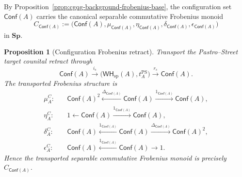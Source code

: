 \documentclass[oneside]{article}
\newcommand{\Conf}{\mathsf{Conf}}
\newcommand{\WH}{\mathsf{WH}}
\newcommand{\Sp}{\mathbf{Sp}}
\theoremstyle{plain}
\newtheorem{proposition}[theorem]{Proposition}
\theoremstyle{definition}
\theoremstyle{remark}
\begin{document}
By Proposition~\ref{prop:cgqg-background-frobenius-base}, the configuration set \(\Conf(A)\) carries the canonical separable commutative Frobenius monoid
\[
    C_{\Conf(A)}
    :=
    \bigl(
        \Conf(A),
        \mu_{\Conf(A)},
        \eta_{\Conf(A)},
        \delta_{\Conf(A)},
        \epsilon_{\Conf(A)}
    \bigr)
\]
in \(\Sp\).

\begin{proposition}[Configuration Frobenius retract]
\label{prop:cgqg-configuration-frobenius-retract}
    Transport the Pastro--Street target counital retract through
    \[
        \Conf(A)
        \xrightarrow{i_s}
        \bigl(
            \WH_{\mathrm{sp}}(A),
            t_A^{\mathrm{PS}}
        \bigr)
        \xrightarrow{r_s}
        \Conf(A).
    \]
    The transported Frobenius structure is
    \begin{equation*}
\begin{aligned}
\mu_A^C:\quad&
 \Conf(A)^2\xleftarrow{\Delta_{\Conf(A)}}\Conf(A)
 \xrightarrow{1_{\Conf(A)}}\Conf(A),\\[.8em]
\eta_A^C:\quad&
 1\longleftarrow\Conf(A)\xrightarrow{1_{\Conf(A)}}\Conf(A),\\[.8em]
\delta_A^C:\quad&
 \Conf(A)\xleftarrow{1_{\Conf(A)}}\Conf(A)
 \xrightarrow{\Delta_{\Conf(A)}}\Conf(A)^2,\\[.8em]
\epsilon_A^C:\quad&
 \Conf(A)\xleftarrow{1_{\Conf(A)}}\Conf(A)\longrightarrow1.
\end{aligned}
\end{equation*}
    Hence the transported separable commutative Frobenius monoid is
    precisely \(C_{\Conf(A)}\).
\end{proposition}
\end{document}
